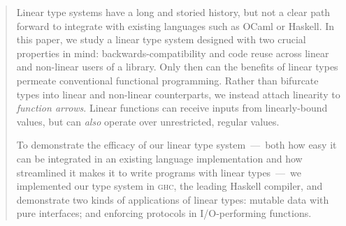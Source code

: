 \documentclass[acmsmall,screen]{acmart}\settopmatter{}
\begin{document}
\begin{abstract}
  Linear type systems have a long and storied history, but not a clear
  path forward to integrate with existing languages such as OCaml or
  Haskell. In this paper, we study a linear type system
  designed with two crucial properties in mind:
  backwards-compatibility and code reuse across linear and non-linear
  users of a library. Only then can the benefits of linear types
  permeate conventional functional programming.  Rather than bifurcate
  types into linear and non-linear counterparts, we instead
  attach linearity to {\em function arrows}.  Linear functions can
  receive inputs from linearly-bound values, but can {\em also} operate over
  unrestricted, regular values.

  To demonstrate the efficacy of our linear type system~---~both how
  easy it can be integrated in an existing language implementation and
  how streamlined it makes it to write programs with linear
  types~---~we implemented our type system in
  \textsc{ghc}, the leading Haskell compiler, and demonstrate
  two kinds of applications of linear types:
  mutable data with pure interfaces;
  and enforcing protocols in I/O-performing functions.
\end{abstract}
\end{document}
